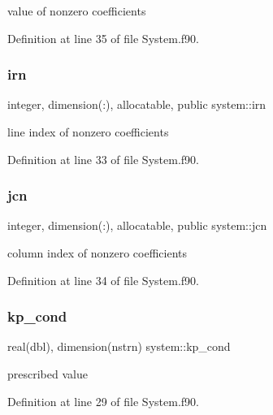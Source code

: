 value of nonzero coefficients 



Definition at line 35 of file System.\+f90.

\mbox{\label{namespacesystem_af8a50eade1073ff9c211526848dcec38}} 
\subsubsection{\texorpdfstring{irn}{irn}}
{\footnotesize\ttfamily integer, dimension(\+:), allocatable, public system\+::irn}



line index of nonzero coefficients 



Definition at line 33 of file System.\+f90.

\mbox{\label{namespacesystem_a32a5c04fae61a0d6a90727cd0bab43a7}} 
\subsubsection{\texorpdfstring{jcn}{jcn}}
{\footnotesize\ttfamily integer, dimension(\+:), allocatable, public system\+::jcn}



column index of nonzero coefficients 



Definition at line 34 of file System.\+f90.

\mbox{\label{namespacesystem_a52739e5016f753e4d31c5f933aa2b79a}} 
\subsubsection{\texorpdfstring{kp\+\_\+cond}{kp\_cond}}
{\footnotesize\ttfamily real(dbl), dimension(nstrn) system\+::kp\+\_\+cond\hspace{0.3cm}{\ttfamily [private]}}



prescribed value 



Definition at line 29 of file System.\+f90.

